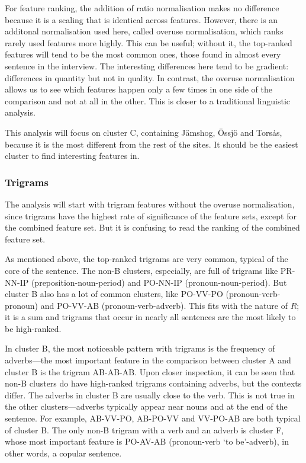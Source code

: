 For feature ranking, the addition of ratio normalisation makes no
difference because it is a scaling that is identical across
features. However, there is an additonal normalisation used here,
called overuse normalisation, which ranks rarely used features more
highly.  This can be useful; without it, the top-ranked features will
tend to be the most common ones, those found in almost every sentence
in the interview. The interesting differences here tend to be
gradient: differences in quantity but not in quality. In contrast,
the overuse normalisation allows us to see which features happen only
a few times in one side of the comparison and not at all in the
other. This is closer to a traditional linguistic analysis.

This analysis will focus on cluster C, containing J\"amshog, \"Ossj\"o
and Tors\.as, because it is the most different from the rest of the
sites. It should be the easiest cluster to find interesting features
in.

\subsubsection{Trigrams}

The analysis will start with trigram features without the overuse
normalisation, since trigrams have the highest rate of
significance of the feature sets, except for the combined feature
set. But it is confusing to read the ranking of the combined feature
set.

As mentioned above, the top-ranked trigrams are very common, typical
of the core of the sentence. The non-B clusters, especially, are full
of trigrams like PR-NN-IP (preposition-noun-period) and PO-NN-IP
(pronoun-noun-period). But cluster B also has a lot of common
clusters, like PO-VV-PO (pronoun-verb-pronoun) and PO-VV-AB
(pronoun-verb-adverb). This fits with the nature of $R$; it is a sum
and trigrams that occur in nearly all sentences are the most likely to
be high-ranked.

In cluster B, the most noticeable pattern with trigrams is the
frequency of adverbs---the most important feature in the comparison
between cluster A and cluster B is the trigram AB-AB-AB.
Upon closer inspection, it can be seen that non-B clusters do have
high-ranked trigrams containing adverbs, but the contexts differ. The
adverbs in cluster B are usually close to the verb. This is not true
in the other clusters---adverbs typically appear near nouns and at the
end of the sentence. For example, AB-VV-PO, AB-PO-VV and VV-PO-AB are
both typical of cluster B. The only non-B trigram with a verb and an
adverb is cluster F, whose most important feature is PO-AV-AB
(pronoun-verb `to be'-adverb), in other words, a copular sentence.

